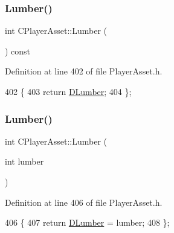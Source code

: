 \subsubsection{\texorpdfstring{Lumber()}{Lumber()}\hspace{0.1cm}{\footnotesize\ttfamily [1/2]}}
{\footnotesize\ttfamily int C\+Player\+Asset\+::\+Lumber (\begin{DoxyParamCaption}{ }\end{DoxyParamCaption}) const\hspace{0.3cm}{\ttfamily [inline]}}



Definition at line 402 of file Player\+Asset.\+h.


\begin{DoxyCode}
402                           \{
403             \textcolor{keywordflow}{return} \hyperlink{classCPlayerAsset_af726ea7df9596f02cdb1428d61186349}{DLumber};
404         \};
\end{DoxyCode}
\hypertarget{classCPlayerAsset_a66a1a78326ba5d6e2892920cbfddebc6}{}\label{classCPlayerAsset_a66a1a78326ba5d6e2892920cbfddebc6} 
\subsubsection{\texorpdfstring{Lumber()}{Lumber()}\hspace{0.1cm}{\footnotesize\ttfamily [2/2]}}
{\footnotesize\ttfamily int C\+Player\+Asset\+::\+Lumber (\begin{DoxyParamCaption}\item[{int}]{lumber }\end{DoxyParamCaption})\hspace{0.3cm}{\ttfamily [inline]}}



Definition at line 406 of file Player\+Asset.\+h.


\begin{DoxyCode}
406                               \{
407             \textcolor{keywordflow}{return} \hyperlink{classCPlayerAsset_af726ea7df9596f02cdb1428d61186349}{DLumber} = lumber;
408         \};
\end{DoxyCode}
\hypertarget{classCPlayerAsset_add6700156ae77b23fcb8fa7831f897d8}{}\label{classCPlayerAsset_add6700156ae77b23fcb8fa7831f897d8} 
